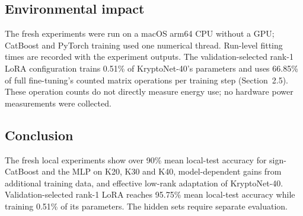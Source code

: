 \documentclass{article}
\begin{document}
\newpage
\subsection{Environmental impact}
The fresh experiments were run on a macOS arm64 CPU without a GPU; CatBoost and PyTorch training used one numerical thread. Run-level fitting times are recorded with the experiment outputs. The validation-selected rank-1 LoRA configuration trains 0.51\% of KryptoNet-40's parameters and uses 66.85\% of full fine-tuning's counted matrix operations per training step (Section~2.5). These operation counts do not directly measure energy use; no hardware power measurements were collected.

\begin{samepage}
\subsection{Conclusion}
The fresh local experiments show over 90\% mean local-test accuracy for sign-CatBoost and the MLP on K20, K30 and K40, model-dependent gains from additional training data, and effective low-rank adaptation of KryptoNet-40. Validation-selected rank-1 LoRA reaches 95.75\% mean local-test accuracy while training 0.51\% of its parameters. The hidden sets require separate evaluation.

\end{samepage}
\end{document}
